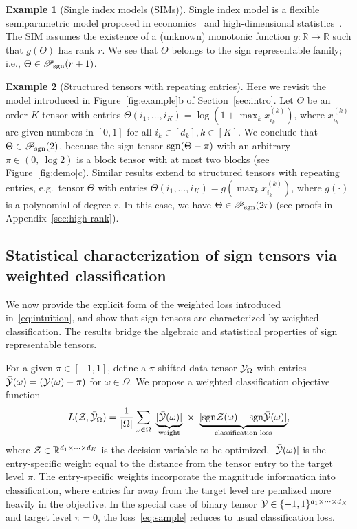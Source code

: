 \documentclass{article}
\theoremstyle{plain}
\theoremstyle{definition}
\newtheorem{example}{Example}
\newcommand*{\KeepStyleUnderBrace}[1]{%
  \mathop{%
    \mathchoice
    {\underbrace{\displaystyle#1}}%
    {\underbrace{\textstyle#1}}%
    {\underbrace{\scriptstyle#1}}%
    {\underbrace{\scriptscriptstyle#1}}%
  }\limits
}
\def\sign{\textup{sgn}}
\def\caliP{\mathscr{P}_{\textup{sgn}}}
\begin{document}
\begin{example}[Single index models (SIMs)] Single index model is a flexible semiparametric model proposed in economics~\citep{robinson1988root} and high-dimensional statistics~\citep{balabdaoui2019least,ganti2017learning}. The SIM assumes the existence of a (unknown) monotonic function $g\colon \mathbb{R}\to \mathbb{R}$ such that $g(\Theta)$ has rank $r$. We see that $\Theta$ belongs to the sign representable family; i.e., $\Theta\in \caliP(r+1)$. 
\end{example}
\vspace{.05cm}

\begin{example}[Structured tensors with repeating entries]\label{eq:example} Here we revisit the model introduced in Figure~\ref{fig:example}b of Section~\ref{sec:intro}. Let $\Theta$ be an order-$K$ tensor with entries $\Theta(i_1,\ldots,i_K)=\log(1+\max_kx^{(k)}_{i_k})$, where $x^{(k)}_{i_k}$ are given numbers in $[0,1]$ for all $i_k\in[d_k], k\in[K]$. We conclude that $\Theta \in \caliP(2)$, because the sign tensor $\sign(\Theta-\pi)$ with an arbitrary $\pi\in(0,\ \log 2)$ is a block tensor with at most two blocks (see Figure~\ref{fig:demo}c). Similar results extend to structured tensors with repeating entries, e.g.\ tensor $\Theta$ with entries $\Theta(i_1,\ldots,i_K)=g(\max_kx^{(k)}_{i_k})$, where $g(\cdot)$ is a polynomial of degree $r$. In this case, we have $\Theta\in \caliP(2r)$ (see proofs in Appendix~\ref{sec:high-rank}). 
\end{example}


\subsection{Statistical characterization of sign tensors via weighted classification}\label{sec:identifiability}
We now provide the explicit form of the weighted loss introduced in~\eqref{eq:intuition}, and show that sign tensors are characterized by weighted classification. The results bridge the algebraic and statistical properties of sign representable tensors.
 
For a given $\pi \in [-1,1]$, define a $\pi$-shifted data tensor $\bar {\mathcal{Y}}_\Omega$ with entries $\bar {\mathcal{Y}}(\omega) = (\mathcal{Y}(\omega)-\pi)$ for $\omega\in \Omega$. We propose a weighted classification objective function
\begin{equation}\label{eq:sample}
L(\tZ, \bar \tY_\Omega)= {1\over |\Omega|}\sum_{\omega \in \Omega}\ \KeepStyleUnderBrace{|\bar \tY(\omega)|}_{\text{weight}}\  \times \ \KeepStyleUnderBrace{| \sign \tZ(\omega)-\sign \bar \tY(\omega)|}_{\text{classification loss}},
\end{equation}
where $\mathcal{Z}\in\mathbb{R}^{d_1\times \cdots \times d_K}$ is the decision variable to be optimized, $|\bar {\mathcal{Y}}(\omega)|$ is the entry-specific weight equal to the distance from the tensor entry to the target level $\pi$. The entry-specific weights incorporate the magnitude information into classification, where entries far away from the target level are penalized more heavily in the objective. In the special case of binary tensor $\mathcal{Y}\in\{-1,1\}^{d_1\times\cdots\times d_K}$ and target level $\pi=0$, the loss~\eqref{eq:sample} reduces to usual classification loss. 
\end{document}

